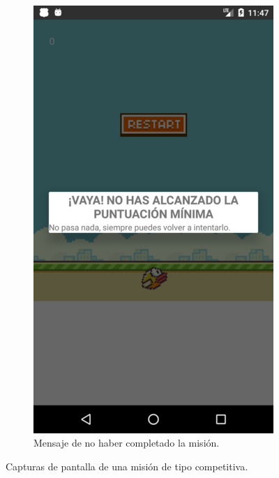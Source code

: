 \documentclass[twoside]{report}
\begin{document}
\begin{figure}[H]
\begin{center}
\begin{subfigure}[t]{.3\linewidth}
		\includegraphics[scale=0.2]{images/userguide/30.png}
		\caption{Mensaje de no haber completado la misión.}
	\end{subfigure}\hspace{2mm}%
\caption{Capturas de pantalla de una misión de tipo competitiva.}
\end{center}
\end{figure}
\end{document}

